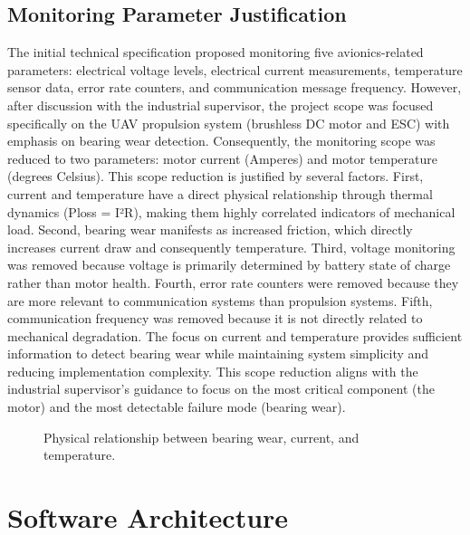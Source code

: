 \subsection{Monitoring Parameter Justification}

The initial technical specification proposed monitoring five avionics-related parameters: electrical voltage levels, electrical current measurements, temperature sensor data, error rate counters, and communication message frequency. However, after discussion with the industrial supervisor, the project scope was focused specifically on the UAV propulsion system (brushless DC motor and ESC) with emphasis on bearing wear detection. Consequently, the monitoring scope was reduced to two parameters: motor current (Amperes) and motor temperature (degrees Celsius). This scope reduction is justified by several factors. First, current and temperature have a direct physical relationship through thermal dynamics (Ploss = I²R), making them highly correlated indicators of mechanical load. Second, bearing wear manifests as increased friction, which directly increases current draw and consequently temperature. Third, voltage monitoring was removed because voltage is primarily determined by battery state of charge rather than motor health. Fourth, error rate counters were removed because they are more relevant to communication systems than propulsion systems. Fifth, communication frequency was removed because it is not directly related to mechanical degradation. The focus on current and temperature provides sufficient information to detect bearing wear while maintaining system simplicity and reducing implementation complexity. This scope reduction aligns with the industrial supervisor's guidance to focus on the most critical component (the motor) and the most detectable failure mode (bearing wear).

\begin{figure}[H]
\centering
\caption{Physical relationship between bearing wear, current, and temperature.}
\label{fig:current_temp_relationship}
\end{figure}

\section{Software Architecture}

